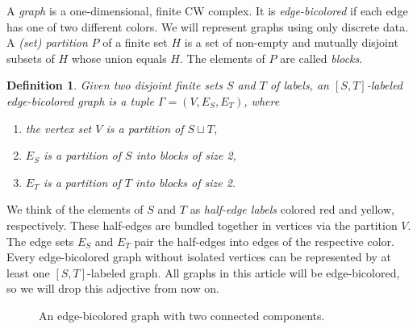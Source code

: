 \documentclass[english]{ourlematemasingle}
\numberwithin{theorem}{section}
\newtheorem{definition}[theorem]{Definition}
\theoremstyle{remark}
\newcommand{\colS}{red}
\newcommand{\colT}{yellow}
\begin{document}
A \emph{graph} is a one-dimensional, finite CW complex. It is \emph{edge-bicolored} if each edge has one of two different colors. We will represent graphs using only discrete data.
A \emph{(set) partition} $P$ of a finite set $H$ is a set of non-empty and mutually disjoint subsets of $H$
whose union equals $H$. The elements of $P$ are called \emph{blocks}.
\begin{definition}
\label{def:bigraph}
Given two disjoint finite sets $S$ and $T$ of labels, an \emph{$[S,T]$-labeled edge-bicolored graph} is a tuple $\Gamma = (V,E_S,E_T)$, where
\begin{enumerate}
\item the \emph{vertex set} $V$ is a partition of $S\sqcup T$,
\item $E_S$ is a partition of $S$ into blocks of size 2,
\item $E_T$ is a partition of $T$ into blocks of size 2.
\end{enumerate}
\end{definition}
We think of the elements of $S$ and $T$ as \emph{half-edge labels} colored 
\colS{} and \colT{}, respectively.
These half-edges are bundled together in vertices via the partition $V$. 
The edge sets $E_S$ and $E_T$ pair the half-edges into edges of the respective color. Every edge-bicolored graph without isolated vertices can be represented by at least one $[S,T]$-labeled graph.
All graphs in this article will be edge-bicolored, so we will drop this adjective from now on. 

    \begin{figure}
        \centering
{}%
        \caption{An edge-bicolored graph with two connected components.}
    \label{fig:extwotadpole2s_rrry}
    \end{figure}
\end{document}
